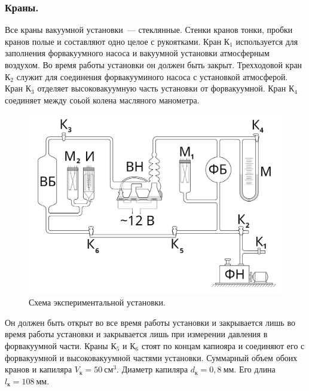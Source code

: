 \documentclass[a4paper,11pt]{article}
\begin{document}
\subsubsection{Краны.}
Все краны вакуумной установки~--- стеклянные. Стенки кранов тонки, пробки кранов полые и составляют одно целое с рукоятками. Кран К$_{1}$ используется для заполнения форвакуумного насоса и вакуумной установки атмосферным воздухом. Во время работы установки он должен быть закрыт. Трехходовой кран К$_{2}$ служит для соединения форвакууминого насоса с установкой атмосферой. Кран К$_{3}$ отделяет высоковакуумную часть установки от форвакуумной. Кран К$_{4}$ соединяет между соьой колена масляного манометра.
\begin{figure}
  \includegraphics[scale = 0.124]{scheme1.png}
  \caption{Схема экспериментальной установки.}
  \label{fig:img1}
\end{figure}
 Он должен быть открыт во все время работы установки и закрывается лишь во время работы установки и закрывается лишь при измерении давления в форвакуумной части. Краны К$_{5}$ и К$_{6}$ стоят по концам капиояра и соединяют его с форвакуумной и высоковакуумной частями установки. Суммарный объем обоих кранов и капиляра $V_{к} = 50\ см^{3}$. Диаметр капиляра $d_{к} = 0,8\ мм$. Его длина $l_{к} = 108\ мм$.
\end{document}
